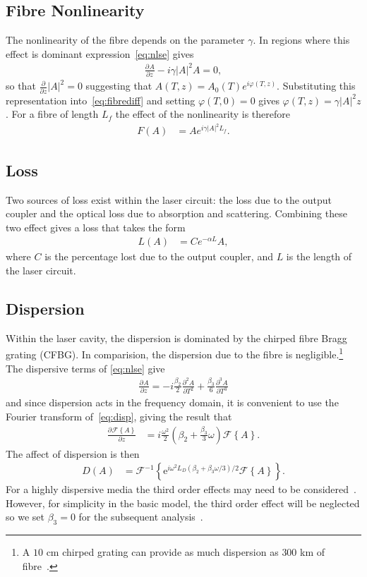 \documentclass[12pt]{article}
\newcommand{\pdiff}[3][]{\frac{\partial^{#1}#2}{\partial{#3}^{#1}}}
\newcommand{\FT}[1]{\mathcal{F}\left\{ #1 \right\}}
\newcommand{\FTi}[1]{\mathcal{F}^{-1}\left\{ #1 \right\}}
\begin{document}
\subsection{Fibre Nonlinearity}
The nonlinearity of the fibre depends on the parameter $\gamma$.  In regions where this effect is dominant 
expression~\eqref{eq:nlse} gives
\begin{align}
\label{eq:fibrediff}
	\pdiff{A}{z} - i \gamma |A|^2 A = 0,
\end{align}
so that $\frac{\partial}{\partial z} |A|^2 = 0$ suggesting that $A(T,z) = A_0(T) e^{i \varphi(T,z)}$.
Substituting this representation into~\eqref{eq:fibrediff} and setting $\varphi(T,0)=0$ gives 
$\varphi(T,z) = \gamma |A|^2 z$. For a fibre of length $L_f$ the effect of the nonlinearity is therefore
\begin{align}
\label{eq:fibre}
	F(A) &= A e^{i \gamma |A|^2 L_f}.
\end{align}

\subsection{Loss}
Two sources of loss exist within the laser circuit: the loss due to the output coupler and the optical loss 
due to absorption and scattering. Combining these two effect gives a loss that takes the form
\begin{align}
\label{eq:fibreloss}
	L(A) &= C e^{- \alpha L}A,
\end{align}
where $C$ is the percentage lost due to the output coupler, and $L$ is the length of the laser circuit.

\subsection{Dispersion}
Within the laser cavity, the dispersion is dominated by the chirped fibre Bragg grating (CFBG).  In comparision,
the dispersion due to the fibre is negligible.\footnote{A $10$ cm chirped grating can provide as much dispersion 
as $300$ km of fibre~\cite{agrawal2002}.} The dispersive terms of \eqref{eq:nlse} give
\begin{align}
\label{eq:disp}
	\pdiff{A}{z} = -i \frac{\beta_2}{2} \pdiff[2]{A}{T} + \frac{\beta_3}{6} \pdiff[3]{A}{T}
\end{align}
and since dispersion acts in the frequency domain, it is convenient to use the Fourier transform 
of~\eqref{eq:disp}, giving the result that
\begin{align*}
	\pdiff{\FT{A}}{z} &= i\frac{\omega^2}{2}\left(\beta_2 + \frac{\beta_3}{3} \omega\right) \FT{A}.
\end{align*}
The affect of dispersion is then
\begin{align}
\label{eq:dispersion}
	D(A) &= \FTi{\textrm{e}^{i \omega^2 L_D(\beta_2 + \beta_3 \omega/3)/2} \FT{A}}.
\end{align}
For a highly dispersive media the third order effects may need to be considered~\cite{agrawal2013, litchinitser}.
However, for simplicity in the basic model, the third order effect will be neglected so we set $\beta_3=0$ for 
the subsequent analysis~\cite{agrawal2013, ferreira}.
\end{document}
